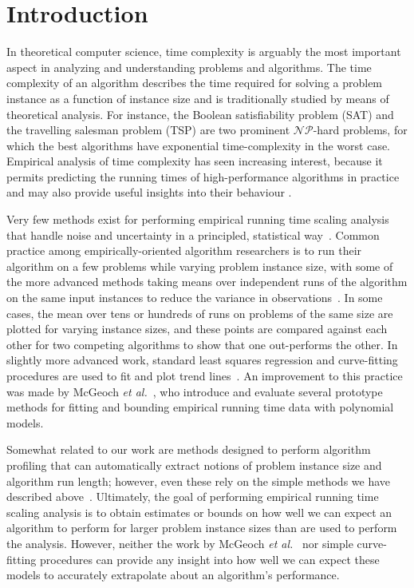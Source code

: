 \documentclass[aic]{iosart2x}
\newcommand{\etal}{\emph{et al.}}
\begin{document}


\section{Introduction}

In theoretical computer science, time complexity is arguably the most
important aspect in analyzing and understanding problems and algorithms.
The time complexity of an algorithm describes the time required for
solving a problem instance as a function of instance size and is traditionally
studied by means of theoretical analysis. For instance, the
Boolean satisfiability problem (SAT) and the travelling salesman problem
(TSP) are two prominent $\mathcal{NP}$-hard problems, for which the best algorithms
have exponential time-complexity in the worst case. Empirical analysis
of time complexity has seen increasing interest, because it permits
predicting the running times of high-performance algorithms in practice
and may also provide useful insights into their behaviour \cite{Kun02,SubDes05,AguEtAl07}.


Very few methods exist for performing empirical running time scaling analysis that handle noise and uncertainty in a principled, statistical way~\cite{Hoo09}. Common practice among empirically-oriented algorithm researchers is to run their algorithm on a few problems while varying problem instance size, with some of the more advanced methods taking means over independent runs of the algorithm on the same input instances to reduce the variance in observations~\cite{Sun09}. In some cases, the mean over tens or hundreds of runs on problems of the same size are plotted for varying instance sizes, and these points are compared against each other for two competing algorithms to show that one out-performs the other. In slightly more advanced work, standard least squares regression and curve-fitting procedures are used to fit and plot trend lines~\cite{ZapHau12}. An improvement to this practice was made by McGeoch \etal~\cite{McgEtAl02}, who introduce and evaluate several prototype methods for fitting and bounding empirical running time data with polynomial models. 

Somewhat related to our work are methods designed to perform algorithm profiling that can automatically extract notions of problem instance size and algorithm run length; however, even these rely on the simple methods we have described above~\cite{ZapHau12,CopEtAl12,CopEtAl14}. Ultimately, the goal of performing empirical running time scaling analysis is to obtain estimates or bounds on how well we can expect an algorithm to perform for larger problem instance sizes than are used to perform the analysis. However, neither the work by McGeoch \etal~\cite{McgEtAl02} nor simple curve-fitting procedures can provide any insight into how well we can expect these models to accurately extrapolate about an algorithm's performance. 
\end{document}
